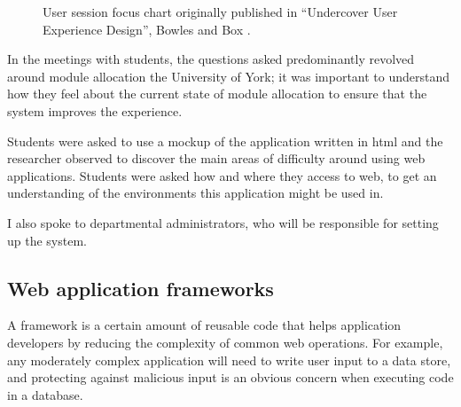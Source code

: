 \documentclass[]{scrartcl}
\begin{document}
\begin{figure}
  \begin{center}
  \end{center}
  \caption{User session focus chart originally published in
    ``Undercover User Experience Design'', Bowles and Box \cite{bowles2011undercover}.}
  \label{bowles_dualpurpose_chart}
\end{figure}

In the meetings with students, the questions asked predominantly revolved
around module allocation the University of York; it was important to
understand how they feel about the current state of module allocation to
ensure that the system improves the experience.

Students were asked to use a mockup of the application written in \gls{html}
and the researcher observed to discover the main areas of difficulty around
using web applications. Students were asked how and where they access to web,
to get an understanding of the environments this application might be used in.


I also spoke to departmental administrators, who will be responsible for setting up
the system.


\subsection{Web application frameworks}
\label{webframeworks}


A framework is a certain amount of reusable code that helps application
developers by reducing the complexity of common web operations. For example,
any moderately complex application will need to write user input to a data
store, and protecting against malicious input is an obvious concern when
executing code in a database.
\end{document}

